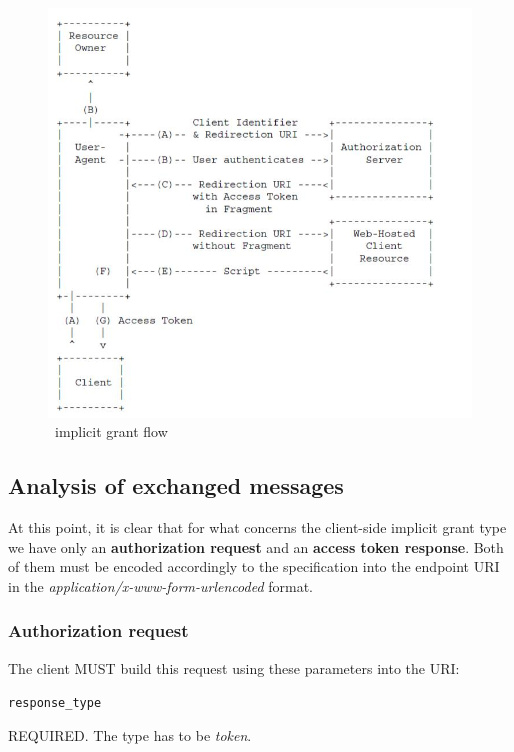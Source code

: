 \begin{figure}[htbp]
    \centering
    \includegraphics[scale=0.6]{chapters/images/chp2/client.jpg}
    \caption{\ implicit grant flow}
    \label{fig:flowa}
\end{figure}

\vspace{1cm}

\subsection{Analysis of exchanged messages}
At this point, it is clear that for what concerns the client-side implicit grant type we have only an \textbf{authorization request} and an \textbf{access token response}. Both of them must be encoded accordingly to the specification into the endpoint URI in the \textit{application/x-www-form-urlencoded} format.

\subsubsection{Authorization request}
\label{authreq}
The client MUST build this request using these parameters into the URI:

\texttt{response\_type}

\hspace{0.5cm}REQUIRED. The type has to be \textit{token}.

